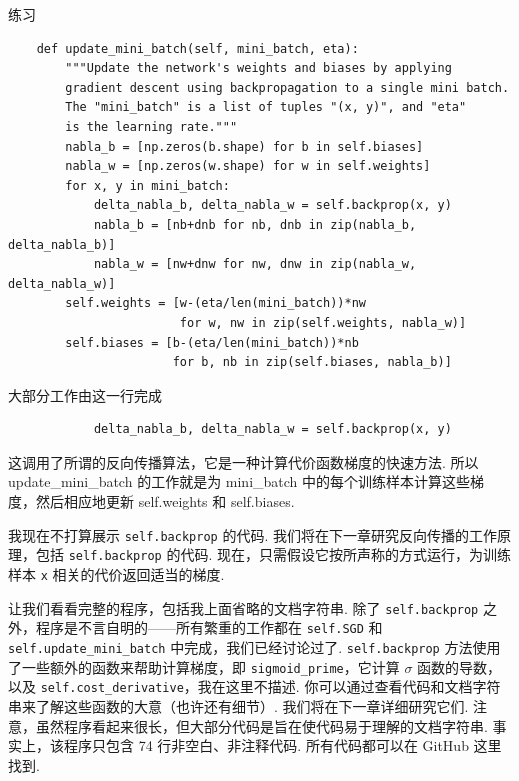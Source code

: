 \begin{exerciseBox}{练习}
\begin{lstlisting}
    def update_mini_batch(self, mini_batch, eta):
        """Update the network's weights and biases by applying
        gradient descent using backpropagation to a single mini batch.
        The "mini_batch" is a list of tuples "(x, y)", and "eta"
        is the learning rate."""
        nabla_b = [np.zeros(b.shape) for b in self.biases]
        nabla_w = [np.zeros(w.shape) for w in self.weights]
        for x, y in mini_batch:
            delta_nabla_b, delta_nabla_w = self.backprop(x, y)
            nabla_b = [nb+dnb for nb, dnb in zip(nabla_b, delta_nabla_b)]
            nabla_w = [nw+dnw for nw, dnw in zip(nabla_w, delta_nabla_w)]
        self.weights = [w-(eta/len(mini_batch))*nw
                        for w, nw in zip(self.weights, nabla_w)]
        self.biases = [b-(eta/len(mini_batch))*nb
                       for b, nb in zip(self.biases, nabla_b)]

\end{lstlisting}

大部分工作由这一行完成

\begin{lstlisting}
            delta_nabla_b, delta_nabla_w = self.backprop(x, y)

\end{lstlisting}

这调用了所谓的反向传播\label{term:42}算法，它是一种计算代价函数梯度的快速方法. 所以 update\_\allowbreak{}mini\_\allowbreak{}batch 的工作就是为 mini\_\allowbreak{}batch 中的每个训练样本计算这些梯度，然后相应地更新 self.weights 和 self.biases.

我现在不打算展示 \texttt{self.backprop} 的代码. 我们将在下一章研究反向传播的工作原理，包括 \texttt{self.backprop} 的代码. 现在，只需假设它按所声称的方式运行，为训练样本 \texttt{x} 相关的代价返回适当的梯度.

让我们看看完整的程序，包括我上面省略的文档字符串. 除了 \texttt{self.backprop} 之外，程序是不言自明的——所有繁重的工作都在 \texttt{self.SGD} 和 \texttt{self.update\_\allowbreak{}mini\_\allowbreak{}batch} 中完成，我们已经讨论过了. \texttt{self.backprop} 方法使用了一些额外的函数来帮助计算梯度，即 \texttt{sigmoid\_\allowbreak{}prime}，它计算 $\sigma$ 函数的导数，以及 \texttt{self.cost\_\allowbreak{}derivative}，我在这里不描述. 你可以通过查看代码和文档字符串来了解这些函数的大意（也许还有细节）. 我们将在下一章详细研究它们. 注意，虽然程序看起来很长，但大部分代码是旨在使代码易于理解的文档字符串. 事实上，该程序只包含 74 行非空白、非注释代码. 所有代码都可以在 GitHub 这里找到.


\end{exerciseBox}
